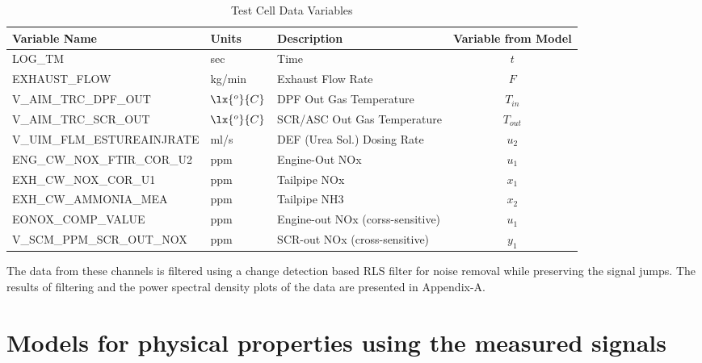 \begin{table}[H]
\centering
\footnotesize
\begin{tabular}{l l l c}
   \hline \hline
   Variable Name              & Units     & Description & Variable from Model \\ \hline \hline
   LOG\_TM	                  & sec & Time
                                          & $t$\\
   EXHAUST\_FLOW	            & kg/min    & Exhaust Flow Rate
                                          & $F$\\
   V\_AIM\_TRC\_DPF\_OUT	   & $\lx{^o}{C}$ & DPF Out Gas Temperature
                                             & $T_{in}$\\
   V\_AIM\_TRC\_SCR\_OUT	   & $\lx{^o}{C}$ & SCR/ASC Out Gas Temperature
                                          & $T_{out}$\\
   V\_UIM\_FLM\_ESTUREAINJRATE& ml/s      & DEF (Urea Sol.) Dosing Rate
                                          & $u_2$\\
   ENG\_CW\_NOX\_FTIR\_COR\_U2& ppm       & Engine-Out NOx
                                          & $u_1$\\
   EXH\_CW\_NOX\_COR\_U1	   & ppm       & Tailpipe NOx
                                          & $x_1$\\
   EXH\_CW\_AMMONIA\_MEA	   & ppm       & Tailpipe NH3
                                          & $x_2$\\
EONOX\_COMP\_VALUE	         & ppm       & Engine-out NOx (corss-sensitive)
                                          & $u_1$\\
V\_SCM\_PPM\_SCR\_OUT\_NOX	   & ppm       & SCR-out NOx (cross-sensitive)
                                          & $y_1$\\
   \hline \hline
\end{tabular}
\caption{Test Cell Data Variables}
\label{tab::test_labels}
\end{table}
The data from these channels is filtered using a change detection based RLS filter \cite{gustafsson2000adaptive} for noise removal while preserving the signal jumps. The results of filtering and the power spectral density plots of the data are presented in Appendix-A.


\section{Models for physical properties using the measured signals}



